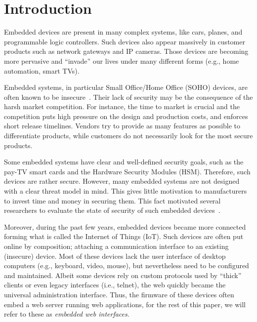 \documentclass[conference]{./templates/ndss/IEEEtran}
\newcounter{t0d0_counter}
\newcounter{pr00f_counter}
\begin{document}
\section{Introduction}
\label{sec:introduction}







Embedded devices are present in many complex systems, like cars,
planes, and programmable logic controllers. Such devices also appear
massively in customer products such as network gateways and IP cameras.
Those devices are becoming more pervasive and ``invade'' our lives under many different forms (e.g., home automation, smart
TVs).


Embedded systems, in particular Small Office/Home Office (SOHO)
devices, are often known to be insecure~\cite{geer_bh,
ieee_sp_state_of_embedded}. Their lack of security may be the
consequence of the harsh market competition. For instance,
the time to market is crucial and the competition puts high pressure
on the design and production costs, and enforces short release 
timelines. Vendors try to provide as many 
features as possible to differentiate products, while customers
do not necessarily look for the most secure products. 

Some embedded systems have clear and well-defined security goals, such as 
the pay-TV smart cards and the Hardware Security Modules (HSM). 
Therefore, such devices are rather secure. However, 
many embedded systems are not designed with a clear threat model in mind.
This gives little motivation to manufacturers to invest time and money 
in securing them. This fact motivated several researchers
to evaluate the state of security of such embedded
devices~\cite{costin2014large, cui-acsac2011-PreyToHunter, 
internetcensus2012, Tripwire, elie-bh2009-EmbedInterfMassInsec, DBLP:journals/corr/NiemietzS15}. 



Moreover, during the past few years, embedded devices became more connected
forming what is called the Internet of Things (IoT). Such devices are often
put online by composition; attaching a communication interface to an
existing (insecure) device.
Most of these devices lack the user interface of desktop computers
(e.g., keyboard, video, mouse), but nevertheless need to be 
configured and maintained. Albeit some devices rely on custom protocols used by ``thick''
clients or even legacy interfaces (i.e., telnet), the web quickly
became the universal administration interface.
Thus, the firmware of these devices often embed a web server running 
web applications, for the rest of this paper, we will refer to these as 
\emph{embedded web interfaces}.
\end{document}
